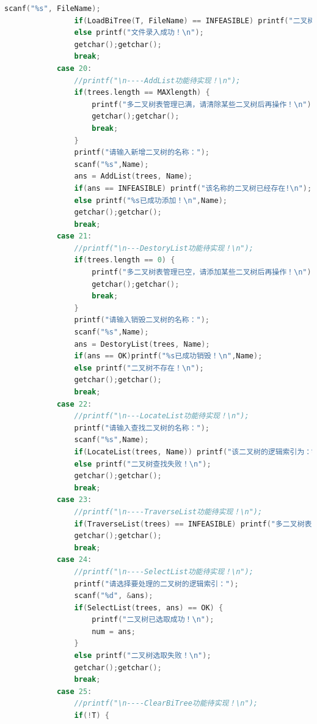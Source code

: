 \documentclass[supercite]{Experimental_Report}
\theoremstyle{definition}
\begin{document}
\begin{lstlisting}[language=c]
                scanf("%s", FileName);
                if(LoadBiTree(T, FileName) == INFEASIBLE) printf("二叉树存在!文件录入失败\n");
                else printf("文件录入成功！\n");
                getchar();getchar();
                break;
            case 20:
                //printf("\n----AddList功能待实现！\n");
                if(trees.length == MAXlength) {
                    printf("多二叉树表管理已满，请清除某些二叉树后再操作！\n");
                    getchar();getchar();
                    break;
                }
                printf("请输入新增二叉树的名称：");
                scanf("%s",Name);
                ans = AddList(trees, Name);
                if(ans == INFEASIBLE) printf("该名称的二叉树已经存在!\n"); 
                else printf("%s已成功添加！\n",Name);
                getchar();getchar();
                break;
            case 21:
                //printf("\n---DestoryList功能待实现！\n");
                if(trees.length == 0) {
                    printf("多二叉树表管理已空，请添加某些二叉树后再操作！\n");
                    getchar();getchar();
                    break;
                }
                printf("请输入销毁二叉树的名称：");
                scanf("%s",Name);
                ans = DestoryList(trees, Name);
                if(ans == OK)printf("%s已成功销毁！\n",Name);
                else printf("二叉树不存在！\n");
                getchar();getchar();
                break;
            case 22:
                //printf("\n---LocateList功能待实现！\n");
                printf("请输入查找二叉树的名称：");
                scanf("%s",Name);
                if(LocateList(trees, Name)) printf("该二叉树的逻辑索引为：%d\n", LocateList(trees, Name));
                else printf("二叉树查找失败！\n");
                getchar();getchar();
                break;
            case 23:
                //printf("\n----TraverseList功能待实现！\n");
                if(TraverseList(trees) == INFEASIBLE) printf("多二叉树表为空！\n");
                getchar();getchar();
                break;
            case 24:
                //printf("\n----SelectList功能待实现！\n");
                printf("请选择要处理的二叉树的逻辑索引：");
                scanf("%d", &ans);
                if(SelectList(trees, ans) == OK) {
                    printf("二叉树已选取成功！\n");
                    num = ans;
                }
                else printf("二叉树选取失败！\n");
                getchar();getchar();
                break;
            case 25:
                //printf("\n----ClearBiTree功能待实现！\n");
                if(!T) {

\end{lstlisting}
\end{document}
